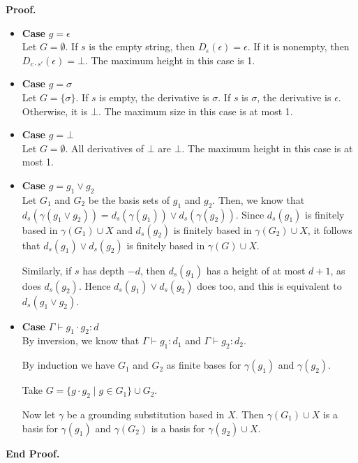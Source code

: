 \documentclass{article}
\newcommand{\judgebalance}[3][\Gamma]{{#1} \vdash {#2} : {#3}}
\newcommand{\setof}[1]{\{{#1}\}}
\newcommand{\comprehend}[2]{\setof{{#1}\;|\;{#2}}}
\newcommand{\deriv}[2]{d_{#1}({#2})}
\newenvironment{proof}{\noindent\textbf{Proof.}}{\noindent\textbf{End Proof.}}
\newenvironment{caseblock}{\begin{itemize}}{\end{itemize}}
\newenvironment{case}[1]{\item \textbf{Case} {#1}\\}{}
\begin{document}
\begin{proof}
\begin{caseblock}
  \begin{case}{$g = \epsilon$}
    Let $G = \emptyset$. If $s$ is the empty string, 
    then $D_\epsilon(\epsilon) = \epsilon$. If it is nonempty, then $D_{c\cdot s'}(\epsilon) = \bot$. 
    The maximum height in this case is 1. 
  \end{case}

  \begin{case}{$g = \sigma$}
    Let $G = \setof{\sigma}$. If $s$ is empty, the derivative is $\sigma$. 
    If $s$ is $\sigma$, the derivative is $\epsilon$. Otherwise, it is $\bot$. 
    The maximum size in this case is at most 1. 
  \end{case}

  \begin{case}{$g = \bot$}
    Let $G = \emptyset$. All derivatives of $\bot$ are $\bot$. 
    The maximum height in this case is at most 1. 
  \end{case}

  \begin{case}{$g = g_1 \vee g_2$}
    Let $G_1$ and $G_2$ be the basis sets of $g_1$ and $g_2$. Then, we know 
    that $\deriv{s}{\gamma(g_1 \vee g_2)} = \deriv{s}{\gamma(g_1)} \vee \deriv{s}{\gamma(g_2)}$. Since
    $\deriv{s}{g_1}$ is finitely based in $\gamma(G_1) \cup X$ and $\deriv{s}{g_2}$ is finitely based in $\gamma(G_2) \cup X$, 
    it follows that $\deriv{s}{g_1} \vee \deriv{s}{g_2}$ is finitely based in $\gamma(G) \cup X$. 

    Similarly, if $s$ has depth $-d$, then $\deriv{s}{g_1}$ has a height of at most $d + 1$,
    as does $\deriv{s}{g_2}$. Hence $\deriv{s}{g_1} \vee \deriv{s}{g_2}$ does too, and this is 
    equivalent to $\deriv{s}{g_1 \vee g_2}$. 
  \end{case}

  \begin{case}{$\judgebalance{g_1\cdot g_2}{d}$}
    By inversion, we know that $\judgebalance{g_1}{d_1}$ and $\judgebalance{g_2}{d_2}$.
    
    By induction we have $G_1$ and $G_2$ as finite bases for $\gamma(g_1)$ and $\gamma(g_2)$. 
    
    Take $G = \comprehend{g\cdot g_2}{g \in G_1 } \cup G_2$. 

    Now let $\gamma$ be a grounding substitution based in $X$. Then 
    $\gamma(G_1) \cup X$ is a basis for $\gamma(g_1)$ and $\gamma(G_2)$ is a basis
    for $\gamma(g_2) \cup X$. 


\end{case}
\end{caseblock}
\end{proof}
\end{document}

